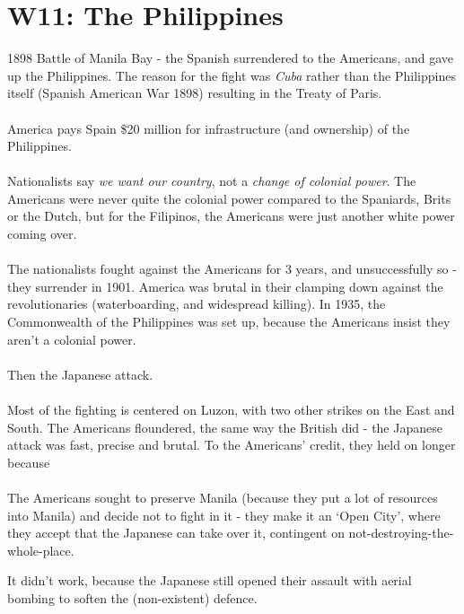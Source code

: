 \documentclass[a4paper]{article}
\begin{document}
\section{W11: The Philippines}
1898 Battle of Manila Bay - the Spanish surrendered to the Americans, and gave up the Philippines. The reason for the fight was \textit{Cuba} rather than the Philippines itself (Spanish American War 1898) resulting in the Treaty of Paris.\\
\\
America pays Spain \$20 million for infrastructure (and ownership) of the Philippines.\\
\\
Nationalists say \textit{we want our country}, not a \textit{change of colonial power}. The Americans were never quite the colonial power compared to the Spaniards, Brits or the Dutch, but for the Filipinos, the Americans were just another white power coming over.\\
\\
The nationalists fought against the Americans for 3 years, and unsuccessfully so - they surrender in 1901. America was brutal in their clamping down against the revolutionaries (waterboarding, and widespread killing). In 1935, the Commonwealth of the Philippines was set up, because the Americans insist they aren't a colonial power.\\
\\
Then the Japanese attack.\\
\\
Most of the fighting is centered on Luzon, with two other strikes on the East and South. The Americans floundered, the same way the British did - the Japanese attack was fast, precise and brutal. To the Americans' credit, they held on longer because\\
\\
The Americans sought to preserve Manila (because they put a lot of resources into Manila) and decide not to fight in it - they make it an `Open City', where they accept that the Japanese can take over it, contingent on not-destroying-the-whole-place.

\begin{displayquote}
	It didn't work, because the Japanese still opened their assault with aerial bombing to soften the (non-existent) defence.
\end{displayquote}
\end{document}
